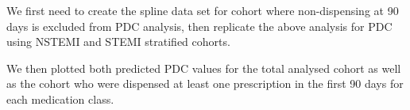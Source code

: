 \documentclass[11pt]{article}
\begin{document}
We first need to create the spline data set for cohort where non-dispensing at 90 days is excluded from PDC analysis, then replicate the above analysis for PDC using NSTEMI and STEMI stratified cohorts.
\color{violet}
\begin{stlog}\end{stlog}
\color{black}
We then plotted both predicted PDC values for the total analysed cohort as well as the cohort who were dispensed at least one prescription in the first 90 days for each medication class. 
\color{violet}
\begin{stlog}\end{stlog}
\clearpage
\color{black}

\end{document}
